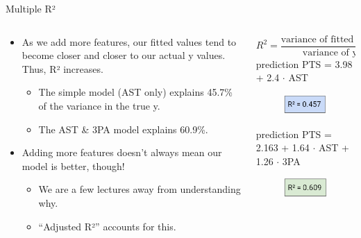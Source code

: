 \documentclass[aspectratio=169]{../latex_main/tntbeamer}  %
\begin{document}
	
	
	
	\begin{frame}{Multiple R²}
	    \begin{columns}
	        \begin{column}{.6\textwidth}
	                \begin{itemize}
	                    \item As we add more features, our fitted values tend to become closer and closer to our actual y values. Thus, R² increases.
	                    \begin{itemize}
	                        \item The simple model (AST only) explains 45.7\% of the variance in the true y.
	                        \item The AST & 3PA model explains 60.9\%.
	                    \end{itemize}
	                    \item Adding more features doesn’t always mean our model is better, though!
	                    \begin{itemize}
	                        \item We are a few lectures away from understanding why.  
	                        \item “Adjusted R²” accounts for this.
	                    \end{itemize}
	                \end{itemize}
	        \end{column}
	            
	        \begin{column}{.4\textwidth}
	        \vspace{-1em}
	                \begin{equation*}
	                     R^2 = \frac{\text{variance of fitted values}}{\text{variance of y}}
	                 \end{equation*}
	            prediction PTS = 3.98 + 2.4 $\cdot$ AST
	            \begin{figure}
	                \includegraphics[scale=.4]{Bild14}
	            \end{figure}
	            
	            prediction PTS = 2.163 + 1.64 $\cdot$ AST + 1.26 $\cdot$ 3PA
	             \begin{figure}
	                \includegraphics[scale=.4]{Bild15}
	            \end{figure}
	        \end{column}
	    \end{columns}
	\end{frame}
\end{document}
